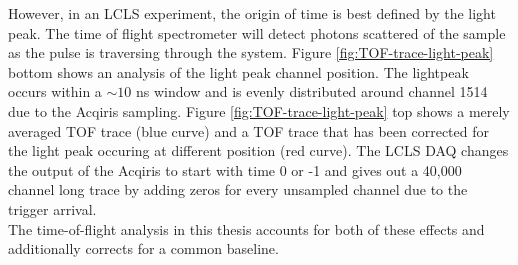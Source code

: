 However, in an LCLS experiment, the origin of time is best defined by the light peak. The time of flight spectrometer will detect photons scattered of the sample as the pulse is traversing through the system. Figure \ref{fig:TOF-trace-light-peak} bottom shows an analysis of the light peak channel position. The lightpeak occurs within a $\sim10$ ns window and is evenly distributed around channel 1514 due to the Acqiris sampling. Figure \ref{fig:TOF-trace-light-peak} top shows a merely averaged TOF trace (blue curve) and a TOF trace that has been corrected for the light peak occuring at different position (red curve). The LCLS DAQ changes the output of the Acqiris to start with time 0 or -1 and gives out a 40,000 channel long trace by adding zeros for every unsampled channel due to the trigger arrival.\\
The time-of-flight analysis in this thesis accounts for both of these effects and additionally corrects for a common baseline.
%
%
%
